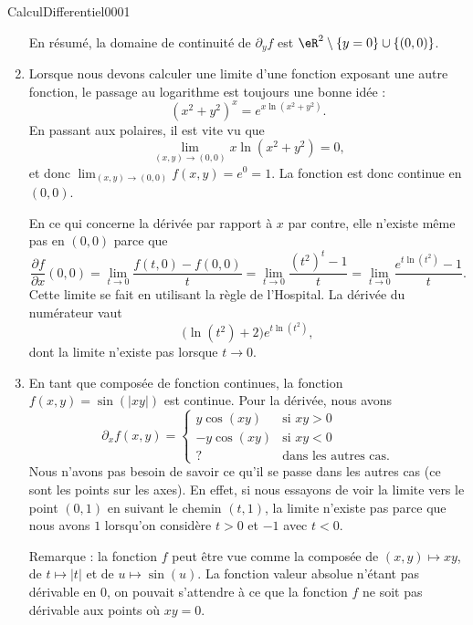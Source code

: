 \begin{corrige}{CalculDifferentiel0001}
\begin{enumerate}
			En résumé, la domaine de continuité de $\partial_yf$ est $\eR^2\setminus\{ y=0 \}\cup\{ (0,0) \}$.
			
			

		\item
			Lorsque nous devons calculer une limite d'une fonction exposant une autre fonction, le passage au logarithme est toujours une bonne idée : 
			\begin{equation}
				(x^2+y^2)^x= e^{x\ln(x^2+y^2)}.
			\end{equation}
			En passant aux polaires, il est vite vu que
			\begin{equation}
				\lim_{(x,y)\to(0,0)}x\ln(x^2+y^2)=0,
			\end{equation}
			et donc $\lim_{(x,y)\to(0,0)}f(x,y)=e^0=1$. La fonction est donc continue en $(0,0)$.

			En ce qui concerne la dérivée par rapport à $x$ par contre, elle n'existe même pas en $(0,0)$ parce que
			\begin{equation}
				\frac{ \partial f }{ \partial x }(0,0)=\lim_{t\to 0} \frac{ f(t,0)-f(0,0) }{ t }=\lim_{t\to 0} \frac{ (t^2)^t-1 }{ t }=\lim_{t\to 0} \frac{  e^{t\ln(t^2)}-1 }{ t }.
			\end{equation}
			Cette limite se fait en utilisant la règle de l'Hospital. La dérivée du numérateur vaut
			\begin{equation}
				\big( \ln(t^2)+2 \big) e^{t\ln(t^2)},
			\end{equation}
			dont la limite n'existe pas lorsque $t\to 0$.

		\item
			En tant que composée de fonction continues, la fonction $f(x,y)=\sin(| xy |)$ est continue. Pour la dérivée, nous avons
			\begin{equation}
				\partial_xf(x,y)=
				\begin{cases}
					y\cos(xy)	&	\text{si }xy>0\\
					-y\cos(xy)	&	\text{si }xy<0\\
					?		&	\text{dans les autres cas}.
				\end{cases}
			\end{equation}
			Nous n'avons pas besoin de savoir ce qu'il se passe dans les autres cas (ce sont les points sur les axes). En effet, si nous essayons de voir la limite vers le point $(0,1)$ en suivant le chemin $(t,1)$, la limite n'existe pas parce que nous avons $1$ lorsqu'on considère $t>0$ et $-1$ avec $t<0$.

			Remarque : la fonction $f$ peut être vue comme la composée de $(x,y)\mapsto xy$, de $t\mapsto| t |$ et de $u\mapsto\sin(u)$. La fonction valeur absolue n'étant pas dérivable en $0$, on pouvait s'attendre à ce que la fonction $f$ ne soit pas dérivable aux points où $xy=0$.


\end{enumerate}
\end{corrige}
